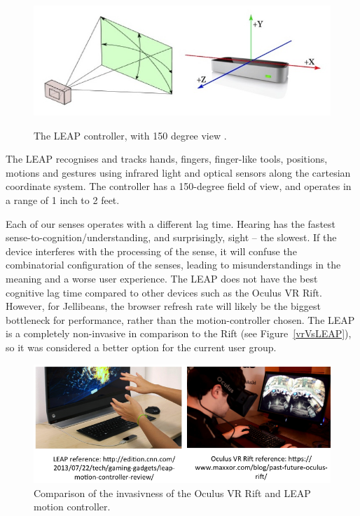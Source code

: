 \documentclass[a4paper, 11pt]{article}
\begin{document}
\begin{figure}[H]
\begin{center}
\includegraphics[scale=0.3]{leap}\\
\caption{The LEAP controller, with 150 degree view \cite{leap}.}
\label{leap}
\end{center}
\end{figure}

The LEAP recognises and tracks hands, fingers, finger-like tools, positions, motions and gestures using infrared light and optical sensors along the cartesian coordinate system. The controller has a 150-degree field of view, and operates in a range of 1 inch to 2 feet.  

\vspace{5mm}
Each of our senses operates with a different lag time. Hearing has the fastest sense-to-cognition/understanding, and surprisingly, sight -- the slowest. If the device interferes with the processing of the sense, it will confuse the combinatorial configuration of the senses, leading to misunderstandings in the meaning and a worse user experience. The LEAP does not have the best cognitive lag time compared to other devices such as the Oculus VR Rift. However, for Jellibeans, the browser refresh rate will likely be the biggest bottleneck for performance, rather than the motion-controller chosen. The LEAP is a completely non-invasive in comparison to the Rift (see Figure~\ref{vrVsLEAP}), so it was considered a better option for the current user group.

\begin{figure}[H]
\begin{center}
\includegraphics[scale=0.5]{VRvsLEAP}
\caption{Comparison of the invasivness of the Oculus VR Rift and LEAP motion controller.}
\label{saveScores}
\end{center}
\end{figure}
\end{document}

